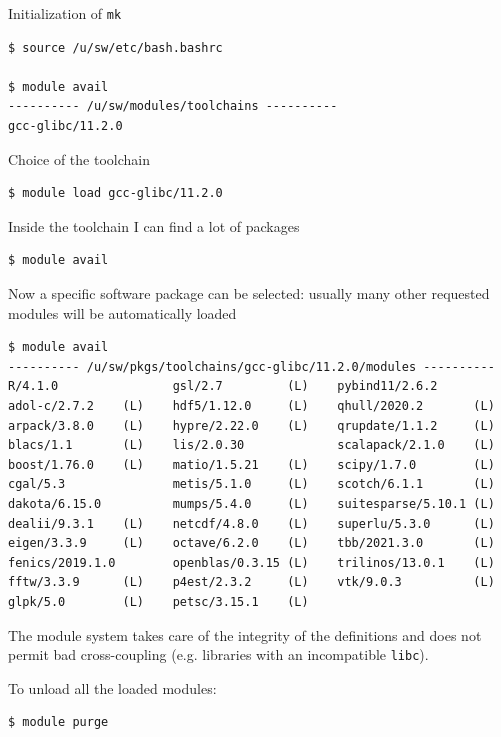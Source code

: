 \documentclass[10pt,aspectratio=169]{beamer}
\begin{document}
\begin{frame}[fragile]

  Initialization of \texttt{mk}

\begin{verbatim}
$ source /u/sw/etc/bash.bashrc

$ module avail
---------- /u/sw/modules/toolchains ----------
gcc-glibc/11.2.0
\end{verbatim}

Choice of the toolchain
\begin{verbatim}
$ module load gcc-glibc/11.2.0
\end{verbatim}

Inside the toolchain I can find a lot of packages
\begin{verbatim}
$ module avail
\end{verbatim}
\end{frame}


\begin{frame}[fragile]
  \small
  Now a specific software package can be selected: usually many other requested modules will be automatically loaded
\begin{verbatim}
$ module avail
---------- /u/sw/pkgs/toolchains/gcc-glibc/11.2.0/modules ----------
R/4.1.0                gsl/2.7         (L)    pybind11/2.6.2
adol-c/2.7.2    (L)    hdf5/1.12.0     (L)    qhull/2020.2       (L)
arpack/3.8.0    (L)    hypre/2.22.0    (L)    qrupdate/1.1.2     (L)
blacs/1.1       (L)    lis/2.0.30             scalapack/2.1.0    (L)
boost/1.76.0    (L)    matio/1.5.21    (L)    scipy/1.7.0        (L)
cgal/5.3               metis/5.1.0     (L)    scotch/6.1.1       (L)
dakota/6.15.0          mumps/5.4.0     (L)    suitesparse/5.10.1 (L)
dealii/9.3.1    (L)    netcdf/4.8.0    (L)    superlu/5.3.0      (L)
eigen/3.3.9     (L)    octave/6.2.0    (L)    tbb/2021.3.0       (L)
fenics/2019.1.0        openblas/0.3.15 (L)    trilinos/13.0.1    (L)
fftw/3.3.9      (L)    p4est/2.3.2     (L)    vtk/9.0.3          (L)
glpk/5.0        (L)    petsc/3.15.1    (L)
\end{verbatim}

The module system takes care of the integrity of the definitions and does not permit bad cross-coupling (e.g. libraries with an incompatible \texttt{libc}).\smallskip

To unload all the loaded modules:
\begin{verbatim}
$ module purge
\end{verbatim}
\end{frame}
\end{document}
